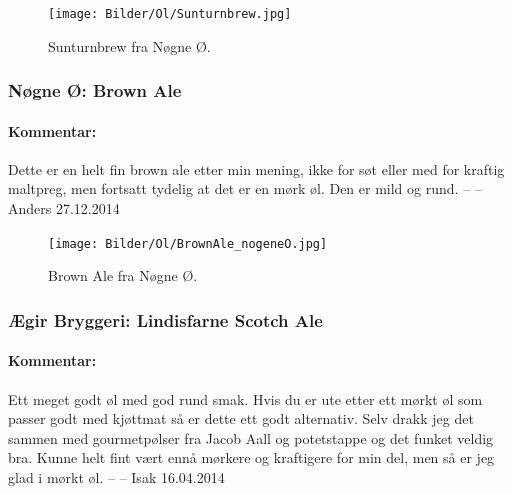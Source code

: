 \documentclass[12pt,a4paper,oneside,norsk]{article}
\begin{document}
\begin{figure} [H] 
\centering
\texttt{[image: Bilder/Ol/Sunturnbrew.jpg]}
\caption{Sunturnbrew fra Nøgne Ø.}
\end{figure}
\newpage

\subsubsection{Nøgne Ø: Brown Ale}
\paragraph{Kommentar:} Dette er en helt fin brown ale etter min mening, ikke for søt eller med for kraftig maltpreg, men fortsatt tydelig at det er en mørk øl. Den er mild og rund.
\newline
-- -- Anders 27.12.2014

\begin{figure} [H] 
\centering
\texttt{[image: Bilder/Ol/BrownAle\_nogeneO.jpg]}
\caption{Brown Ale fra Nøgne Ø.}
\end{figure}
\newpage

\subsubsection{Ægir Bryggeri: Lindisfarne Scotch Ale}
\paragraph{Kommentar:}Ett meget godt øl med god rund smak. Hvis du er ute etter ett mørkt øl som passer godt med kjøttmat så er dette ett godt alternativ. Selv drakk jeg det sammen med gourmetpølser fra Jacob Aall og potetstappe og det funket veldig bra. Kunne helt fint vært ennå mørkere og kraftigere for min del, men så er jeg glad i mørkt øl.  
\newline
-- -- Isak 16.04.2014
\end{document}
